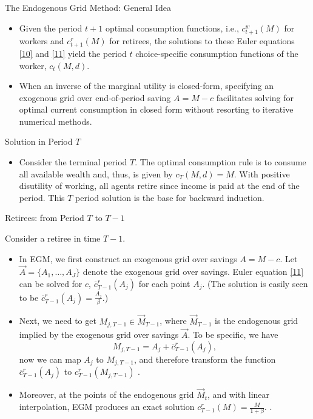 \documentclass[aspectratio=169]{beamer}
\begin{document}
\begin{frame}{The Endogenous Grid Method: General Idea}
	\begin{itemize}
		\item Given the period $t+1$ optimal consumption functions, i.e., $c_{t+1}^w(M)$ for workers and $c_{t+1}^r(M)$ for retirees, the solutions to these Euler equations \ref{10} and \ref{11} yield the period $t$ choice-specific consumption functions of the worker, $c_t(M, d).$ 
		\item When an inverse of the marginal utility is closed-form, specifying an exogenous grid over end-of-period saving $A = M-c$ facilitates solving for optimal current consumption in closed form without resorting to iterative numerical methods. 
	\end{itemize}
\end{frame}

\begin{frame}{Solution in Period $T$}
	\begin{itemize}
		\item Consider the terminal period $T$. The optimal consumption rule is to consume all available wealth and, thus, is given by $c_T (M, d) = M$. With positive disutility of working, all agents retire since income is paid at the end of the period. This $T$ period solution is the base for backward induction.
			\end{itemize}
\end{frame}

\begin{frame}{Retirees: from Period $T$ to $T-1$} \small
	
	Consider a retiree in time $T-1$. 

	\begin{itemize}
		
		\item In EGM, we first construct an exogenous grid over savings $A= M-c$. Let $\overrightarrow{A} = \{ A_1, \ldots, A_J \}$ denote the exogenous grid over savings. Euler equation \ref{11} can be solved for $c$, $\overline{c}_{T-1}^r (A_{j})$ for each point $A_j$. (The solution is easily seen to be $\overline{c}_{T-1}^r (A_{j})= \frac{A_j}{\beta}$.)
		\item Next, we need to get $M_{j, T-1} \in \overrightarrow{M}_{T-1}$, where $\overrightarrow{M}_{T-1}$ is the endogenous grid implied by the exogenous grid over savings $\overrightarrow{A}$. To be specific, we have $$M_{j, T-1} = A_j + \overline{c}_{T-1}^r(A_{j}), $$ now we can map $A_j$ to $M_{j, T-1}$, and therefore transform the function $\overline{c}_{T-1}^r(A_{j})$ to $c_{T-1}^r(M_{j, T-1})$ .
		\item Moreover, at the points of the endogenous grid $\overrightarrow{M}_{t}$, and with linear interpolation, EGM produces an exact solution $c_{T-1}^r(M) = \frac{M}{1+\beta}$. .
	\end{itemize}
	
\end{frame}
\end{document}
